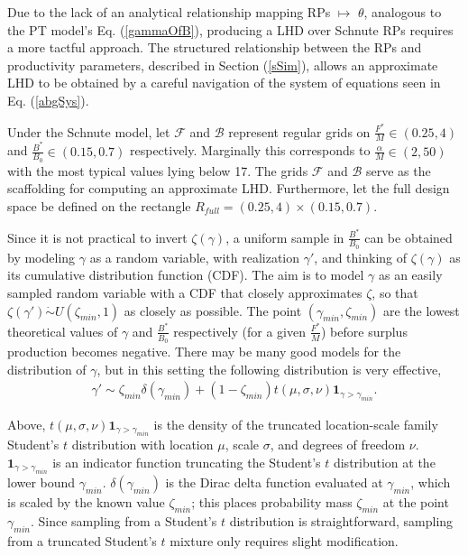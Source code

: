 Due to the lack of an analytical relationship mapping RPs $\mapsto$ $\theta$,
analogous to the PT model's Eq. (\ref{gammaOfB}), producing a LHD over Schnute 
RPs requires a more tactful approach.
The structured relationship between the RPs and productivity parameters,
described in Section (\ref{sSim}), allows an approximate LHD to be obtained by
a careful navigation of the system of equations seen in Eq. (\ref{abgSys}).

%
Under the Schnute model, let $\mathcal{F}$ and $\mathcal{B}$ represent regular grids on
\mbox{$\frac{F^*}{M}\in(0.25, 4)$} and \mbox{$\frac{B^*}{B_0}\in(0.15, 0.7)$}
respectively. Marginally this corresponds to $\frac{\alpha}{M}\in(2, 50)$ with the most typical values lying below 17. %
The grids $\mathcal{F}$ and $\mathcal{B}$ serve as the scaffolding for computing an approximate LHD.
Furthermore, let the full design space be defined on the rectangle $R_{full}=(0.25, 4)\times(0.15, 0.7)$.

%
Since it is not practical to invert $\zeta(\gamma)$, a uniform sample in
$\frac{B^*}{B_0}$ can be obtained by modeling $\gamma$ as a random
variable, with realization $\gamma'$, and thinking of $\zeta(\gamma)$ as its
cumulative distribution function (CDF). The aim is to model $\gamma$ as an
easily sampled random variable with a CDF that closely approximates $\zeta$, so
that $\zeta(\gamma')\dot\sim U(\zeta_{min},1)$ as closely as possible. The 
point $(\gamma_{min}, \zeta_{min})$ are the lowest %
theoretical values of $\gamma$ and $\frac{B^*}{B_0}$ respectively (for a given 
$\frac{F^*}{M}$) before surplus production becomes %
negative\cite{myers_maximum_1999, punt_extending_2019}. %
There may be many good models for the distribution of $\gamma$, but in this 
setting the following distribution is very effective,
%
%
%
%
\begin{align}
\gamma' \sim \zeta_{min}\delta(\gamma_{min}) + (1-\zeta_{min})t(\mu, \sigma, \nu)\bm{1}_{\gamma>\gamma_{min}}. \label{mixT}
\end{align}

Above, $t(\mu, \sigma, \nu)\bm{1}_{\gamma>\gamma_{min}}$ is the density of the truncated location-scale family Student's $t$
distribution with location $\mu$, scale $\sigma$, and degrees of freedom $\nu$.
$\bm{1}_{\gamma>\gamma_{min}}$ is an indicator function truncating the
Student's $t$ distribution at the lower bound $\gamma_{min}$.
$\delta(\gamma_{min})$ is the Dirac delta function evaluated at $\gamma_{min}$,
which is scaled by the known value $\zeta_{min}$; this places probability mass
$\zeta_{min}$ at the point $\gamma_{min}$. Since sampling from a Student's $t$
distribution is straightforward, sampling from a truncated Student's $t$ mixture
only requires slight modification.

